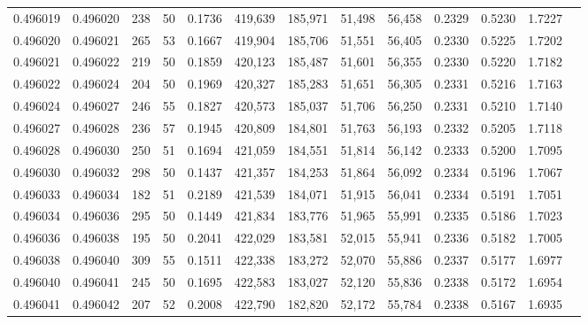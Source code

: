 \begin{tabular}{rrrrrrrrrrrrr}
0.496019 & 0.496020 &   238 &  50 &                                     0.1736 & 419,639 & 185,971 &  51,498 &  56,458 & 0.2329 & 0.5230 & 1.7227 \\
0.496020 & 0.496021 &   265 &  53 &                                     0.1667 & 419,904 & 185,706 &  51,551 &  56,405 & 0.2330 & 0.5225 & 1.7202 \\
0.496021 & 0.496022 &   219 &  50 &                                     0.1859 & 420,123 & 185,487 &  51,601 &  56,355 & 0.2330 & 0.5220 & 1.7182 \\
0.496022 & 0.496024 &   204 &  50 &                                     0.1969 & 420,327 & 185,283 &  51,651 &  56,305 & 0.2331 & 0.5216 & 1.7163 \\
0.496024 & 0.496027 &   246 &  55 &                                     0.1827 & 420,573 & 185,037 &  51,706 &  56,250 & 0.2331 & 0.5210 & 1.7140 \\
0.496027 & 0.496028 &   236 &  57 &                                     0.1945 & 420,809 & 184,801 &  51,763 &  56,193 & 0.2332 & 0.5205 & 1.7118 \\
0.496028 & 0.496030 &   250 &  51 &                                     0.1694 & 421,059 & 184,551 &  51,814 &  56,142 & 0.2333 & 0.5200 & 1.7095 \\
0.496030 & 0.496032 &   298 &  50 &                                     0.1437 & 421,357 & 184,253 &  51,864 &  56,092 & 0.2334 & 0.5196 & 1.7067 \\
0.496033 & 0.496034 &   182 &  51 &                                     0.2189 & 421,539 & 184,071 &  51,915 &  56,041 & 0.2334 & 0.5191 & 1.7051 \\
0.496034 & 0.496036 &   295 &  50 &                                     0.1449 & 421,834 & 183,776 &  51,965 &  55,991 & 0.2335 & 0.5186 & 1.7023 \\
0.496036 & 0.496038 &   195 &  50 &                                     0.2041 & 422,029 & 183,581 &  52,015 &  55,941 & 0.2336 & 0.5182 & 1.7005 \\
0.496038 & 0.496040 &   309 &  55 &                                     0.1511 & 422,338 & 183,272 &  52,070 &  55,886 & 0.2337 & 0.5177 & 1.6977 \\
0.496040 & 0.496041 &   245 &  50 &                                     0.1695 & 422,583 & 183,027 &  52,120 &  55,836 & 0.2338 & 0.5172 & 1.6954 \\
0.496041 & 0.496042 &   207 &  52 &                                     0.2008 & 422,790 & 182,820 &  52,172 &  55,784 & 0.2338 & 0.5167 & 1.6935 \\

\end{tabular}

